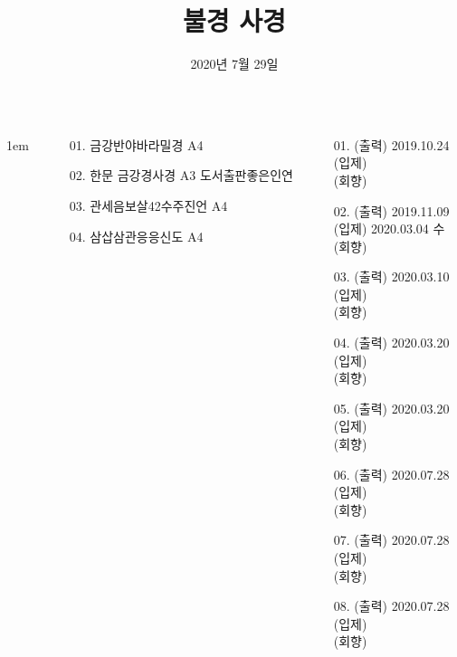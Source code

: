 \documentclass[	20pt, 
							a1paper, 
							portrait, %
							margin=0mm, %
							innermargin=10mm,  		%
							blockverticalspace=4mm, %
							colspace=5mm, 
							subcolspace=0mm
							]{tikzposter}
\title{ 불경 사경 }
\author{ 2020년 7월 29일 }
\institute{ 김대희 }
\begin{document}
	\maketitle

	\begin{columns}


			{
					\setlength{\leftmargini}{3em}
					\setlength{\labelsep} {1em}
				\begin{LARGE}
					\begin{itemize}
					\item [01.] 금강반야바라밀경 A4
					\item [02.] 한문 금강경사경 A3 도서출판좋은인연
					\item [03.] 관세음보살42수주진언 A4
					\item [04.] 삼삽삼관응응신도 A4

					\end{itemize}
				\end{LARGE}
			}






 
			{				
			\setlength{\leftmargini}{3em}
			\setlength{\labelsep}{1em} %

			\begin{LARGE}
			\begin{itemize}
			\item [01.] (출력) 2019.10.24 \\(입제) \\(회향)
			\item [02.] (출력) 2019.11.09 \\(입제) 2020.03.04 수 \\(회향)
			\item [03.] (출력) 2020.03.10 \\(입제) \\(회향)
			\item [04.] (출력) 2020.03.20 \\(입제) \\(회향)
			\item [05.] (출력) 2020.03.20 \\(입제) \\(회향)
			\item [06.] (출력) 2020.07.28 \\(입제) \\(회향)
			\item [07.] (출력) 2020.07.28 \\(입제) \\(회향)
			\item [08.] (출력) 2020.07.28 \\(입제) \\(회향)


\end{itemize}
\end{LARGE}}
\end{columns}
\end{document}
